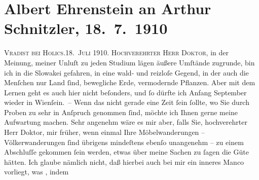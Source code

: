 

         
         \renewcommand{\erwaehntePersonen}{Personen: Hanns von Gumppenberg}
         \renewcommand{\erwaehnteInstitutionen}{Institutionen: März}
         \renewcommand{\erwaehnteOrte}{Orte: Slowakei, Vrádište, Wien}
         \renewcommand{\erwaehnteWerke}{Werke: Graf Cilli}
               \section[Albert Ehrenstein an Arthur Schnitzler, 18. 7. 1910]{ Albert Ehrenstein an Arthur Schnitzler, 18. 7. 1910}\nopagebreak{}\rehead{ }\begin{ledgroupsized}[t]{13cm}\normalsize\beginnumbering \toendnotes[C]{\smallbreak\pagebreak[2]} 
\toendnotes[C]{\smallbreak}\pstart
           {\pb}\textsc{Vradist bei Holics}.\hfill \textsc{18. Juli 1910}.\pend
           \pstart{}\textsc{Hochverehrter Herr Doktor,}\pend\pstart
           in der Meinung, meiner Unluſt zu jeden Studium lägen äußere Umſtände zugrunde, bin
               ich in die Slowakei gefahren, in eine wald- und
               reizloſe Gegend, in der auch die Menſchen nur Land ſind, bewegliche Erde, vermodernde
               Pflanzen. Aber mit dem Lernen geht es auch hier nicht beſonders, und ſo dürfte ich
                  Anfang September wieder in Wienſein. – Wenn das nicht gerade eine Zeit ſein
               ſollte, wo Sie durch Proben zu sehr in Anſpruch genommen ſind, möchte ich Ihnen gerne
               meine Aufwartung machen. Sehr angenehm wäre es mir aber, falls Sie, hochverehrter
               Herr Doktor, {\pb}mir
               früher, wenn einmal Ihre Möbelwanderungen – Völkerwanderungen ſind übrigens
               mindeſtens ebenſo unangenehm – zu einem Abschluſſe gekommen ſein werden, etwas über
               meine Sachen zu ſagen die Güte hätten.\pend
           \pstart
           Ich glaube nämlich nicht, daß hierbei auch bei mir ein inneres Manco vorliegt, was
                  \label{K_L01948_1v}\label{K_L01948_1h}, indem

\end{ledgroupsized}
